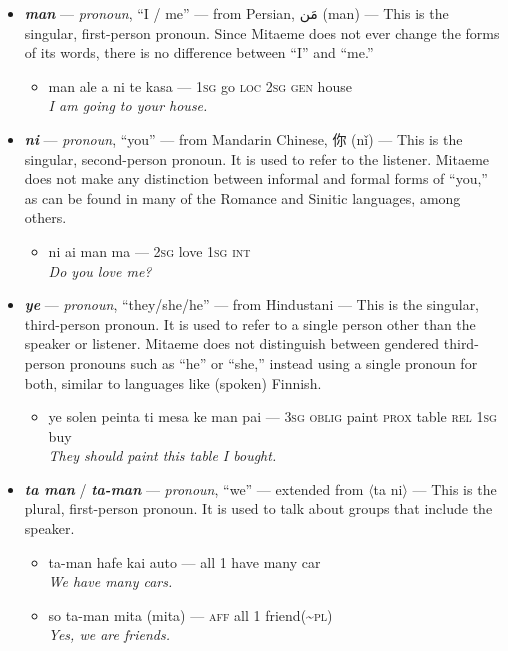 \documentclass[a4paper]{article}
\begin{document}
\begin{itemize}
	\item \textbf{\textit{man}} — \textit{pronoun}, ``I / me'' — from Persian, {\afont  مَن} (man) — This is the singular, first-person pronoun. Since Mitaeme does not ever change the forms of its words, there is no difference between ``I'' and ``me.''
	\begin{itemize}
		\item man ale a ni te kasa — \textsc{1sg} go \textsc{loc 2sg gen} house \\\textit{I am going to your house.}
	\end{itemize}
	\item \textbf{\textit{ni}} — \textit{pronoun}, ``you'' — from Mandarin Chinese, 你 (nǐ) — This is the singular, second-person pronoun. It is used to refer to the listener. Mitaeme does not make any distinction between informal and formal forms of ``you,'' as can be found in many of the Romance and Sinitic languages, among others.
	\begin{itemize}
		\item ni ai man ma — \textsc{2sg} love \textsc{1sg int} \\\textit{Do you love me?}
	\end{itemize}
	\item \textbf{\textit{ye}} — \textit{pronoun}, ``they/she/he'' — from Hindustani — This is the singular, third-person pronoun. It is used to refer to a single person other than the speaker or listener. Mitaeme does not distinguish between gendered third-person pronouns such as ``he'' or ``she,'' instead using a single pronoun for both, similar to languages like (spoken) Finnish.
	\begin{itemize}
		\item ye solen peinta ti mesa ke man pai — \textsc{3sg oblig} paint \textsc{prox} table \textsc{rel 1sg} buy \\\textit{They should paint this table I bought.}
	\end{itemize}
	\item \textbf{\textit{ta man}} / \textbf{\textit{ta-man}} — \textit{pronoun}, ``we'' — extended from $\langle$ta ni$\rangle$ — This is the plural, first-person pronoun. It is used to talk about groups that include the speaker.
	\begin{itemize}
		\item ta-man hafe kai auto — all 1 have many car \\\textit{We have many cars.}
		\item so ta-man mita (mita) — \textsc{aff} all 1 friend(\textasciitilde{}\textsc{pl}) \\\textit{Yes, we are friends.}

\end{itemize}
\end{itemize}
\end{document}
